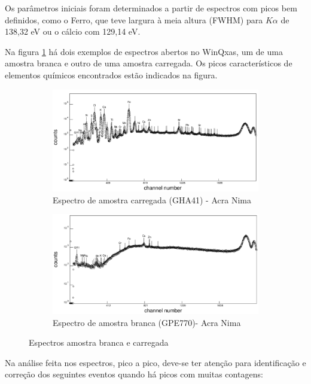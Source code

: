 Os parâmetros iniciais foram determinados a partir de espectros com picos 
bem definidos, como o Ferro, que teve largura à meia altura (FWHM) para 
$K\alpha$ de 138,32 eV ou o cálcio com 129,14 eV.

Na figura \ref{fig:winqxas} há dois exemplos de espectros abertos no WinQxas, 
um de uma amostra branca e outro de uma amostra carregada. Os picos 
característicos de elementos químicos encontrados estão indicados na figura.

\begin{figure}[H]
  \centering
  \begin{subfigure}[b]{0.7\textwidth}
    \includegraphics[width=\textwidth]{../inputs/images/winqxas/GHA41editado.pdf}
    \caption{Espectro de amostra carregada (GHA41) - Acra Nima}
  \end{subfigure}
  \begin{subfigure}[b]{0.7\textwidth}
    \includegraphics[width=\textwidth]{../inputs/images/winqxas/GPE770editado.pdf}
     \caption{Espectro de amostra branca (GPE770)- Acra Nima}
  \end{subfigure}
  \caption{Espectros amostra branca e carregada \label{fig:winqxas}}
\end{figure}

Na análise feita nos espectros, pico a pico, deve-se ter atenção 
para identificação e correção dos seguintes eventos quando há picos com 
muitas contagens: 


